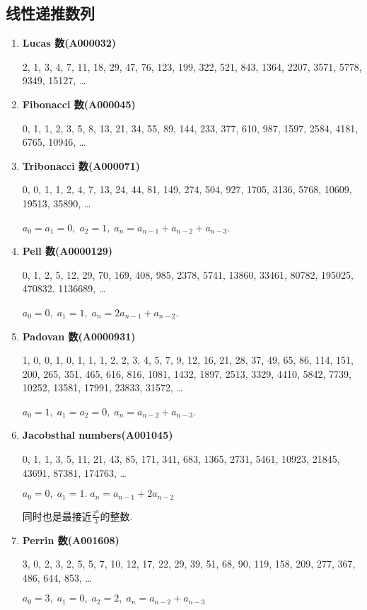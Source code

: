 \subsection{线性递推数列}

\begin{enumerate}

\item \textbf{Lucas 数(A000032)}

2, 1, 3, 4, 7, 11, 18, 29, 47, 76, 123, 199, 322, 521, 843, 1364, 2207, 3571, 5778, 9349, 15127, \dots

\item \textbf{Fibonacci 数(A000045)}

0, 1, 1, 2, 3, 5, 8, 13, 21, 34, 55, 89, 144, 233, 377, 610, 987, 1597, 2584, 4181, 6765, 10946, \dots

\item \textbf{Tribonacci 数(A000071)}

0, 0, 1, 1, 2, 4, 7, 13, 24, 44, 81, 149, 274, 504, 927, 1705, 3136, 5768, 10609, 19513, 35890, \dots

\( a_0 = a_1 = 0,\; a_2 = 1,\; a_n = a_{n - 1} + a_{n - 2} + a_{n - 3} \).

\item \textbf{Pell 数(A0000129)}

0, 1, 2, 5, 12, 29, 70, 169, 408, 985, 2378, 5741, 13860, 33461, 80782, 195025, 470832, 1136689, \dots

\( a_0 = 0,\; a_1 = 1,\; a_n = 2a_{n - 1} + a_{n - 2} \).

\item \textbf{Padovan 数(A0000931)}

1, 0, 0, 1, 0, 1, 1, 1, 2, 2, 3, 4, 5, 7, 9, 12, 16, 21, 28, 37, 49, 65, 86, 114, 151, 200, 265, 351, 465, 616, 816, 1081, 1432, 1897, 2513, 3329, 4410, 5842, 7739, 10252, 13581, 17991, 23833, 31572, \dots

\(a_0 = 1,\; a_1 = a_2 = 0,\; a_n = a_{n - 2} + a_{n - 3}\).

\item \textbf{Jacobsthal numbers(A001045)}

0, 1, 1, 3, 5, 11, 21, 43, 85, 171, 341, 683, 1365, 2731, 5461, 10923, 21845, 43691, 87381, 174763, \dots

\( a_0 = 0,\; a_1 = 1.\; a_n = a_{n - 1} + 2a_{n - 2} \)

同时也是最接近\(\frac {2 ^ n} 3\)的整数.

\item \textbf{Perrin 数(A001608)}

3, 0, 2, 3, 2, 5, 5, 7, 10, 12, 17, 22, 29, 39, 51, 68, 90, 119, 158, 209, 277, 367, 486, 644, 853, \dots

\( a_0 = 3,\; a_1 = 0,\; a_2 = 2,\; a_n = a_{n - 2} + a_{n - 3} \)

\end{enumerate}

